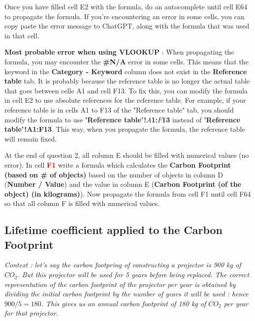 \documentclass{exam}
\begin{document}
\begin{questions}
  \question Once you have filled cell E2 with the formula, do an autocomplete until cell E64 to propagate the formula. If you're encountering an error in some cells, you can copy paste the error message to ChatGPT, along with the formula that was used in that cell. 

\begin{Indication}
  \textbf{Most probable error when using VLOOKUP} : When propagating the formula, you may encounter the \textbf{\#N/A} error in some cells. This means that the keyword in the \textbf{Category - Keyword} column does not exist in the \textbf{Reference table} tab. It is probably because the reference table is no longer the actual table that goes between celle A1 and cell F13. To fix this, you can modify the formula in cell E2 to use absolute references for the reference table. For example, if your reference table is in cells A1 to F13 of the "Reference table" tab, you should modify the formula to use \textbf{'Reference table'!$A$1:$F$13} instead of \textbf{'Reference table'!A1:F13}. This way, when you propagate the formula, the reference table will remain fixed.
\end{Indication}

\question At the end of question 2, all column E should be filled with numerical values (no error). In cell \textbf{\textcolor{red}{F1}} write a formula which calculates the \textbf{Carbon Footprint (based on \# of objects)} based on the number of objects in column D (\textbf{Number / Value}) and the value in column E (\textbf{Carbon Footprint (of the object) (in kilograms)}).
\question Now propagate the formula from cell F1 until cell F64 so that all column F is filled with numerical values.

\end{questions}

\subsection*{Lifetime coefficient applied to the Carbon Footprint}

\textit{Context : let's say the carbon footpring of constructing a projector is 900 kg of $CO_2$. But this projector will be used for 5 years before being replaced. The correct representation of the carbon footprint of the projector per year is obtained by dividing the initial carbon footprint by the number of years it will be used : hence $900/5=180$.  This gives us an annual carbon footprint of 180 kg of $CO_2$ per year for that projector.}
\end{document}
